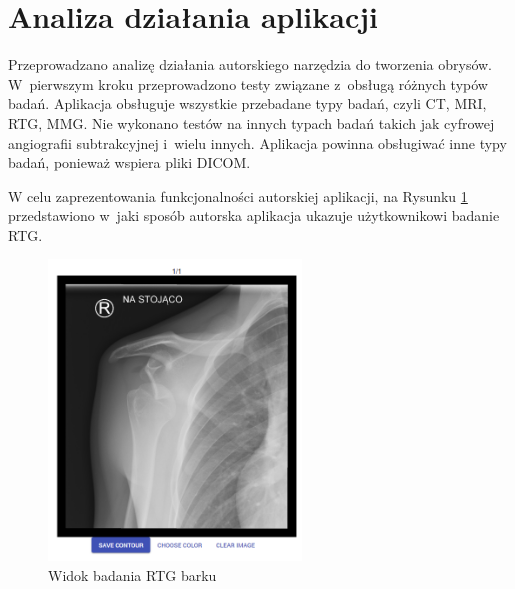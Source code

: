 \documentclass[a4paper,11pt,twoside,openright]{report}
\theoremstyle{definition}
\begin{document}



\section {Analiza działania aplikacji}



Przeprowadzano analizę działania autorskiego narzędzia do tworzenia obrysów.
W~pierwszym kroku przeprowadzono testy związane z~obsługą różnych typów badań.
Aplikacja obsługuje wszystkie przebadane typy badań, czyli CT, MRI, RTG, MMG.
Nie wykonano testów na innych typach badań takich jak cyfrowej angiografii subtrakcyjnej
i~wielu innych. Aplikacja powinna obsługiwać inne typy badań, ponieważ wspiera pliki DICOM.

W celu zaprezentowania funkcjonalności autorskiej aplikacji, na Rysunku \ref{fig:113}
przedstawiono w~jaki sposób autorska aplikacja ukazuje
użytkownikowi badanie RTG.

\begin{figure}[h!]
	\center
	\includegraphics[width=0.6\textwidth]{113}
	\caption{Widok badania RTG barku}
    	\label{fig:113}
\end{figure}
\end{document}
